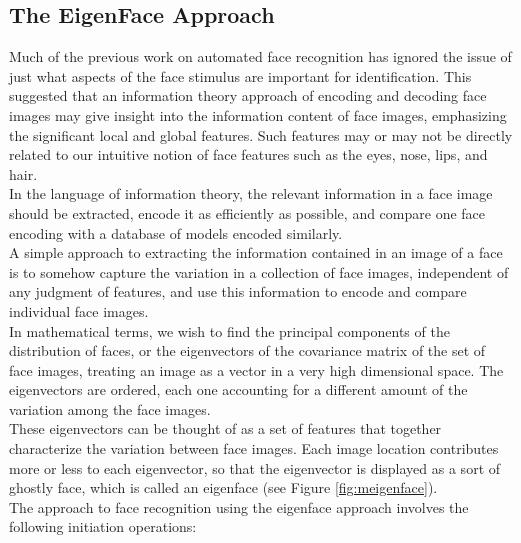 \documentclass[conference]{IEEEtran}
\begin{document}
\subsection{The EigenFace Approach}
Much of the previous work on automated face recognition has ignored the issue of
just what aspects of the face stimulus are important for identification.
This suggested that an information theory approach of encoding and decoding
face images may give insight into the information content of face images,
emphasizing the significant local and global features. Such features may or may not
be directly related to our intuitive notion of face features such as the eyes, nose,
lips, and hair. \\
In the language of information theory, the relevant information in a face image
should be extracted, encode it as efficiently as possible, and compare one face
encoding with a database of models encoded similarly. \\
A simple approach to extracting the information contained in an image of a face
is to somehow capture the variation in a collection of face images, independent
of any judgment of features, and use this information to encode and compare
individual face images. \\
In mathematical terms, we wish to find the principal components of the distribution of
faces, or the eigenvectors of the covariance matrix of the set of face images,
treating an image as a vector in a very high dimensional space. The eigenvectors
are ordered, each one accounting for a different amount of the variation among the face
images. \\
These eigenvectors can be thought of as a set of features that together characterize
the variation between face images. Each image location contributes more or less
to each eigenvector, so that the eigenvector is displayed as a sort of ghostly
face, which is called an eigenface (see Figure \ref{fig:meigenface}). \\
The approach to face recognition using the eigenface approach involves the
following initiation operations: \\
\end{document}
